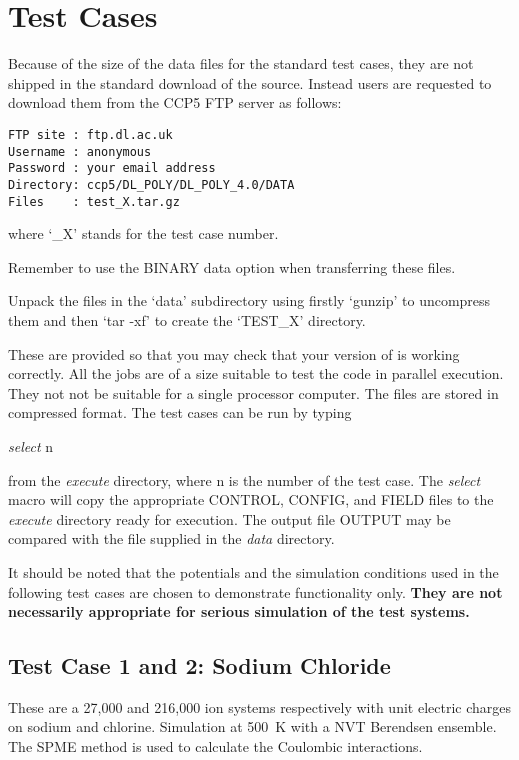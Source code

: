 \section{Test Cases}

Because of the size of the data files for the \D
standard test cases, they are not shipped in the standard
download of the \D source.  Instead users are requested
to download them from the CCP5 FTP server as follows:

\begin{verbatim}
FTP site : ftp.dl.ac.uk
Username : anonymous
Password : your email address
Directory: ccp5/DL_POLY/DL_POLY_4.0/DATA
Files    : test_X.tar.gz
\end{verbatim}

where `\_X' stands for the test case number.

Remember to use the BINARY data option when transferring these
files.

Unpack the files in the `data' subdirectory using firstly
`gunzip' to uncompress them and then `tar -xf' to create the
`TEST\_X' directory.

These are provided so that you may check that your version of
\D is working correctly.  All the jobs are of a size suitable
to test the code in parallel execution.  They not not be
suitable for a single processor computer.  The files are stored
in compressed format.  The test cases can be run by typing

{\sl select } n

\noindent from the {\em execute} directory, where n is the number of
the test case.  The {\sl select} macro will copy the appropriate
CONTROL, CONFIG, and FIELD files to the {\em execute} directory
ready for execution.  The output file OUTPUT may be compared with
the file supplied in the {\em data} directory.

It should be noted that the potentials and the simulation
conditions used in the following test cases are chosen to
demonstrate functionality only.  {\bf They are not necessarily
appropriate for serious simulation of the test systems.}

\subsection{Test Case 1 and 2: Sodium Chloride}

These are a 27,000 and 216,000 ion systems respectively with unit
electric charges on sodium and chlorine.  Simulation at 500~K with a
NVT Berendsen ensemble.  The SPME method is used to calculate the
Coulombic interactions.

